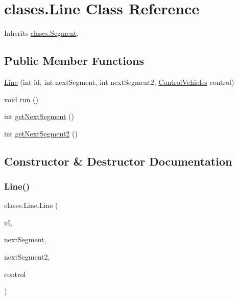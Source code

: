 \hypertarget{classclases_1_1_line}{}\section{clases.\+Line Class Reference}
\label{classclases_1_1_line}


Inherits \mbox{\hyperlink{classclases_1_1_segment}{clases.\+Segment}}.

\subsection*{Public Member Functions}
\begin{DoxyCompactItemize}
\item 
\mbox{\hyperlink{classclases_1_1_line_a77b02132b68c73e6f59e04b76aebcefc}{Line}} (int id, int next\+Segment, int next\+Segment2, \mbox{\hyperlink{classcontrol_1_1_control_vehicles}{Control\+Vehicles}} control)
\item 
void \mbox{\hyperlink{classclases_1_1_line_a5746922f975ee20fc0cbe9533f97a1db}{run}} ()
\item 
int \mbox{\hyperlink{classclases_1_1_line_a59a8aaaed373c81611fe1f003012d0bd}{get\+Next\+Segment}} ()
\item 
int \mbox{\hyperlink{classclases_1_1_line_af330f196c35a61d78325b45a8b590357}{get\+Next\+Segment2}} ()
\end{DoxyCompactItemize}


\subsection{Constructor \& Destructor Documentation}
\mbox{\label{classclases_1_1_line_a77b02132b68c73e6f59e04b76aebcefc}} 
\subsubsection{\texorpdfstring{Line()}{Line()}}
{\footnotesize\ttfamily clases.\+Line.\+Line (\begin{DoxyParamCaption}\item[{int}]{id,  }\item[{int}]{next\+Segment,  }\item[{int}]{next\+Segment2,  }\item[{\mbox{\hyperlink{classcontrol_1_1_control_vehicles}{Control\+Vehicles}}}]{control }\end{DoxyParamCaption})}



